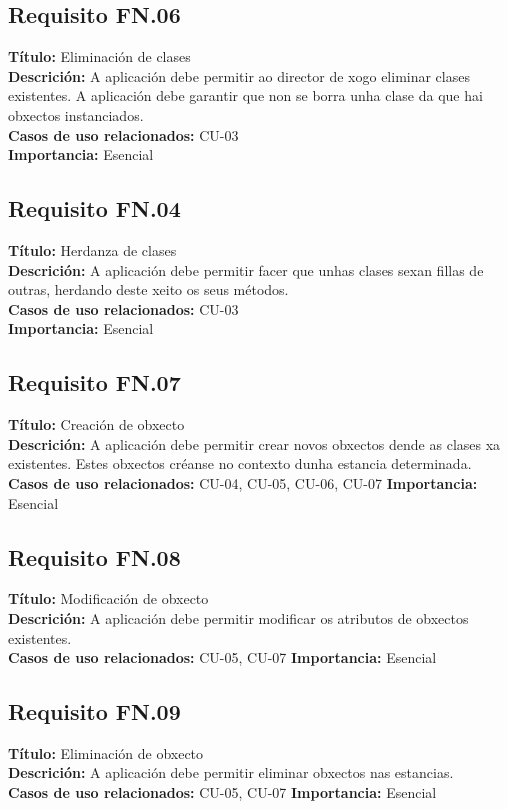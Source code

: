 \subsection{Requisito FN.06}
{\bf Título:} Eliminación de clases\\
{\bf Descrición:} A aplicación debe permitir ao director de xogo eliminar clases existentes. A aplicación debe garantir que non se borra unha clase da que hai obxectos instanciados.\\
{\bf Casos de uso relacionados:} CU-03\\
{\bf Importancia:} Esencial

\subsection{Requisito FN.04}
{\bf Título:} Herdanza de clases\\
{\bf Descrición:} A aplicación debe permitir facer que unhas clases sexan fillas de outras, herdando deste xeito os seus métodos.\\
{\bf Casos de uso relacionados:} CU-03\\
{\bf Importancia:} Esencial

\subsection{Requisito FN.07}
{\bf Título:} Creación de obxecto\\
{\bf Descrición:} A aplicación debe permitir crear novos obxectos dende as clases xa existentes. Estes obxectos créanse no contexto dunha estancia determinada.\\
{\bf Casos de uso relacionados:} CU-04, CU-05, CU-06, CU-07
{\bf Importancia:} Esencial

\subsection{Requisito FN.08}
{\bf Título:} Modificación de obxecto\\
{\bf Descrición:} A aplicación debe permitir modificar os atributos de obxectos existentes.\\
{\bf Casos de uso relacionados:} CU-05, CU-07
{\bf Importancia:} Esencial

\subsection{Requisito FN.09}
{\bf Título:} Eliminación de obxecto\\
{\bf Descrición:} A aplicación debe permitir eliminar obxectos nas estancias.\\
{\bf Casos de uso relacionados:} CU-05, CU-07
{\bf Importancia:} Esencial

